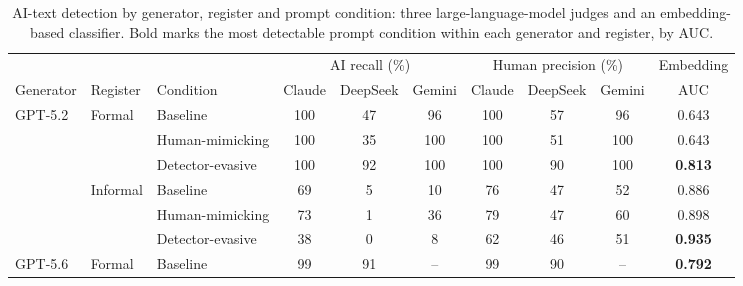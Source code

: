 %
%
\begin{table}[htbp]
  \centering
  \small
  \caption{AI-text detection by generator, register and prompt condition: three
  large-language-model judges and an embedding-based classifier. Bold marks the most
  detectable prompt condition within each generator and register, by AUC.}
  \label{tab:judge-embedding-merged}
  \begin{tabular}{lll ccc ccc c}
    \toprule
    & & & \multicolumn{3}{c}{AI recall (\%)}
        & \multicolumn{3}{c}{Human precision (\%)} & Embedding \\
    \cmidrule(lr){4-6} \cmidrule(lr){7-9} \cmidrule(l){10}
    Generator & Register & Condition
      & Claude & DeepSeek & Gemini & Claude & DeepSeek & Gemini & AUC \\
    \midrule
    \multirow{6}{*}{GPT-5.2}
      & \multirow{3}{*}{Formal}
        & Baseline         & 100 & 47 & 96  & 100 & 57 & 96  & 0.643 \\
      & & Human-mimicking  & 100 & 35 & 100 & 100 & 51 & 100 & 0.643 \\
      & & Detector-evasive & 100 & 92 & 100 & 100 & 90 & 100 & \textbf{0.813} \\
    \cmidrule(l){2-10}
      & \multirow{3}{*}{Informal}
        & Baseline         & 69 & 5 & 10 & 76 & 47 & 52 & 0.886 \\
      & & Human-mimicking  & 73 & 1 & 36 & 79 & 47 & 60 & 0.898 \\
      & & Detector-evasive & 38 & 0 & 8  & 62 & 46 & 51 & \textbf{0.935} \\
    \midrule
    \multirow{6}{*}{GPT-5.6}
      & \multirow{3}{*}{Formal}
        & Baseline         & 99  & 91 & -- & 99  & 90 & -- & \textbf{0.792} \\

\end{tabular}
\end{table}
